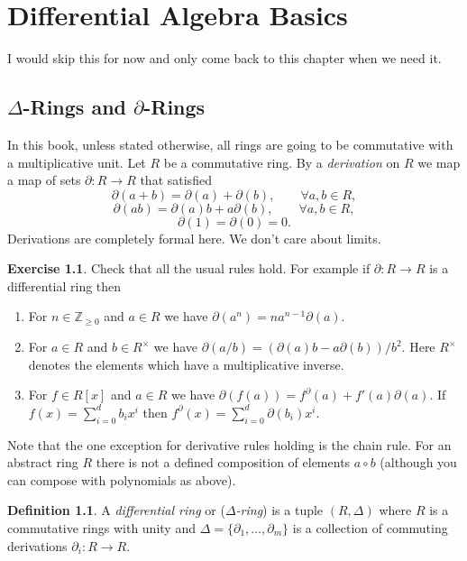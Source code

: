 \documentclass[]{book}
\numberwithin{equation}{section}
\theoremstyle{definition}
\newtheorem{definition}[theorem]{Definition}
\newtheorem{exercise}[theorem]{Exercise}
\theoremstyle{remark}
\newcommand{\ZZ}{\mathbb{Z}}
\begin{document}
\mainmatter



\chapter{Differential Algebra Basics}
I would skip this for now and only come back to this chapter when we need it. 

\section{$\Delta$-Rings and $\partial$-Rings}
In this book, unless stated otherwise, all rings are going to be commutative with a multiplicative unit. 
Let $R$ be a commutative ring. 
By a \emph{derivation} on $R$ we map a map of sets $\partial:R\to R$ that satisfied 
 $$ \partial(a+b) = \partial(a) + \partial(b), \qquad \forall a,b\in R,$$
 $$ \partial(ab) = \partial(a) b + a\partial(b), \qquad \forall a, b \in R, $$
 $$ \partial(1) = \partial(0) = 0.$$
Derivations are completely formal here. 
We don't care about limits. 

\begin{exercise}
	Check that all the usual rules hold. For example if $\partial:R \to R$ is a differential ring then 
	\begin{enumerate}
		\item For $n\in \ZZ_{\geq 0}$ and $a \in R$ we have $\partial(a^n) = na^{n-1}\partial(a)$.
		\item For $a \in R$ and $b\in R^{\times}$ we have $\partial(a/b) = (\partial(a)b - a \partial(b))/b^2$. Here $R^{\times}$ denotes the elements which have a multiplicative inverse.
		\item For $f \in R[x]$ and $a \in R$ we have $\partial(f(a)) = f^{\partial}(a) + f'(a)\partial(a)$. If $f(x) = \sum_{i=0}^d b_i x^i$ then $f^{\partial}(x) = \sum_{i=0}^d \partial(b_i) x^i$. 
	\end{enumerate}
\end{exercise}
Note that the one exception for derivative rules holding is the chain rule. 
For an abstract ring $R$ there is not a defined composition of elements $a\circ b$ (although you can compose with polynomials as above).


\begin{definition}
	A \emph{differential ring} or (\emph{$\Delta$-ring}) is a tuple $(R,\Delta)$ where $R$ is a commutative rings with unity and $\Delta = \lbrace \partial_1,\ldots,\partial_m\rbrace$ is a collection of commuting derivations $\partial_i:R \to R$. 
\end{definition}
\end{document}
